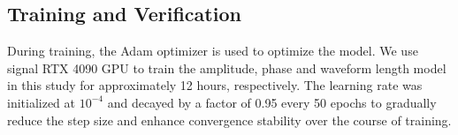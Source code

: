 \documentclass[
reprint,
superscriptaddress,
amsmath,amssymb,
aps,
prd,
floatfix,
]{revtex4-2}
\begin{document}

\subsection{Training and Verification}\label{subsec:tni}
During training, the Adam optimizer \cite{Kingma2017} is used to optimize the model. We use signal RTX 4090 GPU to train the amplitude, phase and waveform length model in this study for approximately 12 hours, respectively. 
The learning rate was initialized at $10^{-4}$ and decayed by a factor of 0.95 every 50 epochs to gradually reduce the step size and enhance convergence stability over the course of training.
\end{document}

